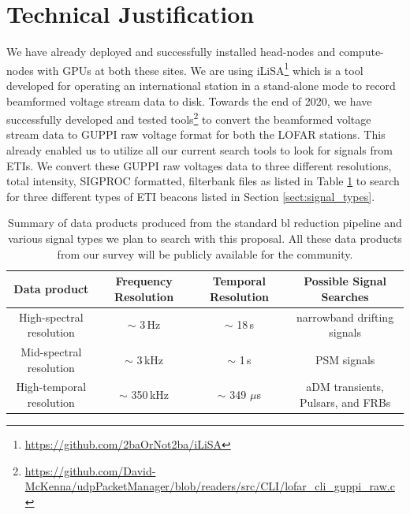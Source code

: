 \documentclass{aastex63}
\begin{document}
\section{Technical Justification}
\label{sect:technical_justification}
We have already deployed and successfully installed head-nodes and compute-nodes with GPUs at both these sites. We are using iLiSA\footnote{\url{https://github.com/2baOrNot2ba/iLiSA}} which is a tool developed for operating an international station in a stand-alone mode to record beamformed voltage stream data to disk. Towards the end of 2020, we have successfully developed and tested tools\footnote{\url{https://github.com/David-McKenna/udpPacketManager/blob/readers/src/CLI/lofar_cli_guppi_raw.c}} to convert the beamformed voltage stream data to GUPPI raw voltage \citep{lebofsky2019} format for both the LOFAR stations. This already enabled us to utilize all our current search tools to look for signals from ETIs. We convert these GUPPI raw voltages data to three different resolutions, total intensity, SIGPROC formatted, filterbank files as listed in Table \ref{tab:formats} to search for three different types of ETI beacons listed in Section \ref{sect:signal_types}. 

\begin{table}[h]
\caption{Summary of data products produced from the standard \gls{bl} reduction pipeline and various signal types we plan to search with this proposal. All these data products from our survey will be publicly available for the community.}
    \centering
    \begin{tabular}{c c c c}
    Data product    & Frequency Resolution  & Temporal Resolution & Possible Signal Searches\\
    \hline
    \hline
   High-spectral resolution &   $\sim$ 3\,Hz &  $\sim$ 18\,s  & narrowband drifting signals \\
   Mid-spectral resolution  &   $\sim$ 3\,kHz &  $\sim$ 1\,s  & PSM signals \\
   High-temporal resolution &    $\sim$ 350\,kHz &  $\sim$ 349 $\mu$s & aDM transients, Pulsars, and FRBs \\
   \hline
    \end{tabular}
    \label{tab:formats}
\end{table}{}
\end{document}
